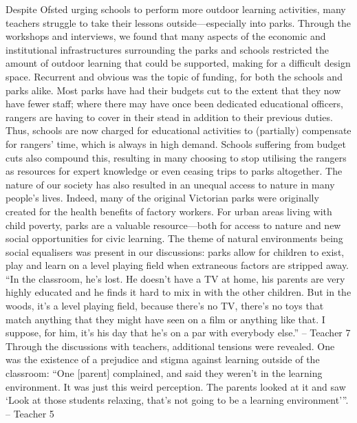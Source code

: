 Despite Ofsted urging schools to perform more outdoor learning activities, many teachers struggle to take their lessons outside—especially into parks. Through the workshops and interviews, we found that many aspects of the economic and institutional infrastructures surrounding the parks and schools restricted the amount of outdoor learning that could be supported, making for a difficult design space.
Recurrent and obvious was the topic of funding, for both the schools and parks alike. Most parks have had their budgets cut to the extent that they now have fewer staff; where there may have once been dedicated educational officers, rangers are having to cover in their stead in addition to their previous duties. Thus, schools are now charged for educational activities to (partially) compensate for rangers’ time, which is always in high demand.  Schools suffering from budget cuts also compound this, resulting in many choosing to stop utilising the rangers as resources for expert knowledge or even ceasing trips to parks altogether.
The nature of our society has also resulted in an unequal access to nature in many people’s lives. Indeed, many of the original Victorian parks were originally created for the health benefits of factory workers. For urban areas living with child poverty, parks are a valuable resource—both for access to nature and new social opportunities for civic learning. The theme of natural environments being social equalisers was present in our discussions: parks allow for children to exist, play and learn on a level playing field when extraneous factors are stripped away.
 “In the classroom, he’s lost. He doesn't have a TV at home, his parents are very highly educated and he finds it hard to mix in with the other children. But in the woods, it’s a level playing field, because there’s no TV, there’s no toys that match anything that they might have seen on a film or anything like that. I suppose, for him, it’s his day that he’s on a par with everybody else.” – Teacher 7
Through the discussions with teachers, additional tensions were revealed.  One was the existence of a prejudice and stigma against learning outside of the classroom:
“One [parent] complained, and said they weren’t in the learning environment. It was just this weird perception. The parents looked at it and saw ‘Look at those students relaxing, that’s not going to be a learning environment’”. – Teacher 5
